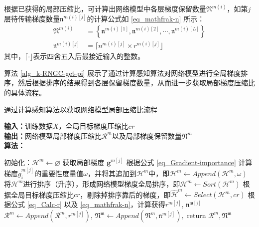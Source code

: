 \documentclass{xdupgthesis}
\begin{document}
根据已获得的局部压缩比，可计算出网络模型中各层梯度保留数量$\mathfrak{N}^{m(i)}$，如第$j$层待传输梯度数量$\mathfrak{n}^{m(i)[j]}$的计算公式如 \eqref{eq_mathfrak-n} 所示：
\begin{equation}
    \begin{aligned}
        \mathfrak{N}^{m(i)} &= \left\{\mathfrak{n}^{m(i)[1]}, \mathfrak{n}^{m(i)[2]}, \cdots, \mathfrak{n}^{m(i)[L]} \right\} \\
        \mathfrak{n}^{m(i)[j]} &=
            \lceil n^{m(i)[j]} \times r^{m(i)[j]} \rfloor  
        \label{eq_mathfrak-n}
    \end{aligned}
\end{equation}
其中，$\lceil \cdot \rfloor$表示四舍五入后最接近输入的整数。

算法 \ref*{alg_k-RNGC-get-pi} 展示了通过计算感知算法对网络模型进行全局梯度排序，然后根据排序的结果得到各层保留梯度数量，从而进一步获取局部梯度压缩比的具体流程。

\renewcommand{\arraystretch}{1.3}
\begin{algorithm}[ht]
    \caption{通过计算感知算法以获取网络模型局部压缩比流程}
    \label{alg_k-RNGC-get-pi}
    \raggedright
    \hspace*{0.02in} \textbf{输入：}训练数据$X$，全局目标梯度压缩比$cr$ \\
    \hspace*{0.02in} \textbf{输出：}网络模型局部梯度压缩比$\mathcal{R}^{m}$以及局部梯度保留数量$\mathfrak{N}^{m}$ \\
    \hspace*{0.02in} \textbf{算法：} \\
    \begin{algorithmic}[1]
        \State 初始化：$\mathcal{H}^{m} \leftarrow \varnothing$
            \State 获取局部梯度 $\mathbf{g}^{m[j]}$
                \State 根据公式 \eqref{eq_Gradient-importance} 计算梯度$g^{m[j]}_{i}$的重要性度量值$\omega$，并将其追加到$\mathcal{H}^{m}$中，即$\mathcal{H}^{m} \leftarrow Append\left(\mathcal{H}^{m}, \omega\right)$
            \EndFor
        \EndFor
        \State 将$\mathcal{H}^{m}$进行排序（升序），形成网络模型梯度全局排序，即$\mathcal{H}^{m} \leftarrow Sort\left(\mathcal{H}^{m}\right)$
        \State 根据全局目标梯度压缩比$cr$，剔除掉排序靠后的梯度，即$\hat{\mathcal{H}}^{m} \leftarrow Select(\mathcal{H}^{m}, cr)$
             \State 根据公式 \eqref{eq_Calc-r} 以及 \eqref{eq_mathfrak-n}，计算获得$r^{m[j]}$, $\mathfrak{n^{m[j]}}$
            \State $\mathcal{R}^{m} \leftarrow Append\left(\mathcal{R}^{m}, r^{m[j]}\right)$, $\mathfrak{N^{m}} \leftarrow Append\left(\mathfrak{N}^{m}, \mathfrak{n}^{m[j]}\right),$
        \EndFor
        \State return $\mathcal{R}^{m}, \mathfrak{N^{m}}$
    \end{algorithmic}
\end{algorithm}
\end{document}
